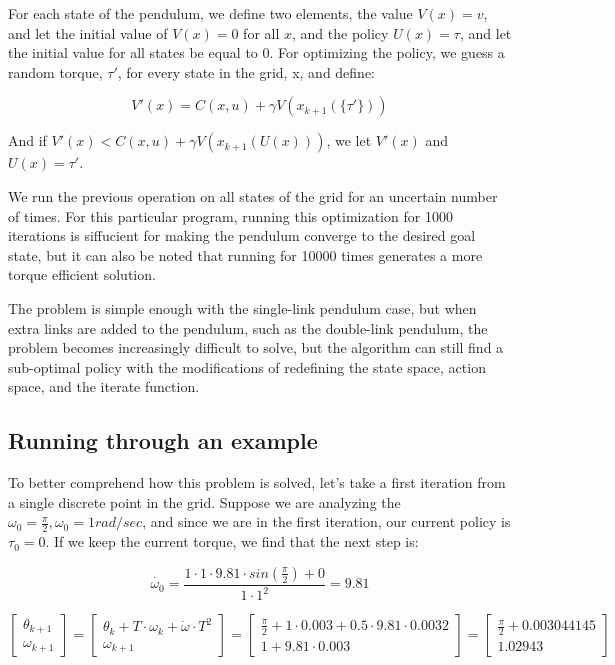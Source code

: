 \documentclass{article}
\begin{document}
For each state of the pendulum, we define two elements, the value $V(x) = {v}$, and let the initial value of $V(x)=0$ for all $x$, and the policy $U(x)={\tau}$, and let the initial value for all states be equal to 0. For optimizing the policy, we guess a random torque, $\tau'$, for every state in the grid, x, and define:

\begin{equation} 
V'(x) = C(x,u) + \gamma V(x_{k+1}(\{\tau '\}))
\end{equation}

And if $V'(x)<C(x,u) + \gamma V(x_{k+1}(U(x)))$, we let $V'(x)$ and $U(x)={\tau'}$.

We run the previous operation on all states of the grid for an uncertain number of times. For this particular program, running this optimization for 1000 iterations is siffucient for making the pendulum converge to the desired goal state, but it can also be noted that running for 10000 times generates a more torque efficient solution.

The problem is simple enough with the single-link pendulum case, but when extra links are added to the pendulum, such as the double-link pendulum, the problem becomes increasingly difficult to solve, but the algorithm can still find a sub-optimal policy with the modifications of redefining the state space, action space, and the iterate function.

\subsection{Running through an example}

To better comprehend how this problem is solved, let’s take a first iteration from a single discrete point in the grid. Suppose we are analyzing the $\omega_0=\frac{\pi}{2}, \omega_0=1 rad/sec$, and since we are in the first iteration, our current policy is $\tau_0=0$. If we keep the current torque, we find that the next step is:
	
\begin{equation} 
\dot{\omega_0} = \frac{1 \cdot 1 \cdot 9.81 \cdot sin(\frac{\pi}{2})+0}{1 \cdot 1^2} = 9.81
\end{equation}

\begin{equation} 
\begin{bmatrix}
\theta_{k+1} \\
\omega_{k+1}
\end{bmatrix}
=
\begin{bmatrix}
\theta_{k} + T \cdot \omega_{k} + \dot{\omega} \cdot T^2 \\
\omega_{k+1}
\end{bmatrix}
=
\begin{bmatrix}
\frac{\pi}{2}+1 \cdot 0.003 + 0.5 \cdot 9.81 \cdot 0.0032 \\
1 + 9.81 \cdot 0.003
\end{bmatrix}
=
\begin{bmatrix}
\frac{\pi}{2}+0.003044145 \\
1.02943
\end{bmatrix}
\end{equation}
\end{document}
